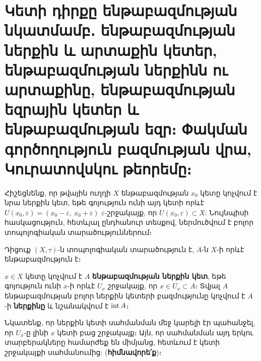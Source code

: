 \documentclass[./main.tex]{subfiles}
\begin{document}
\onehalfspacing




\section{Կետի դիրքը ենթաբազմության նկատմամբ․ ենթաբազմության ներքին և արտաքին կետեր, ենթաբազմության ներքինն ու արտաքինը, ենթաբազմության եզրային կետեր և ենթաբազմության եզր։ Փակման գործողություն բազմության վրա, Կուրատովսկու թեորեմը։}\label{sec:6}

Հիշեցնենք, որ թվային ուղղի $X$ ենթաբազմության $x_0$ կետը կոչվում է նրա ներքին կետ, եթե գոյություն ունի այդ կետի որևէ $U(x_0, \varepsilon) = (x_0 - \varepsilon,\ x_0 + \varepsilon)$ $\varepsilon$-շրջակայք, որ $U(x_0, \varepsilon) \subset X$: Նույնպիսի հասկացություն, հետևյալ ընդհանուր տեսքով, ներմուծվում է բոլոր տոպոլոգիական տարածություններում։

Դիցուք $(X, \tau)$-ն տոպոլոգիական տարածություն է, $A$-ն $X$-ի որևէ ենթաբազմու\-թյուն է։

\begin{definition}
$x \in X$ կետը կոչվում է $A$ \textbf{ենթաբազմության ներքին կետ}, եթե գոյություն ունի $x$-ի որևէ $U_x$ շրջակայք, որ $x\in U_x \subset A$։ Տվյալ $A$ ենթաբազմության բոլոր ներքին կետերի բազմությունը կոչվում է $A$-ի \textbf{ներքինը} և նշանակվում է $\operatorname{int} A$։
\end{definition}

Նկատենք, որ ներքին կետի սահմանման մեջ կարելի էր պահանջել, որ $U_x$-ը լինի $x$ կետի բաց շրջակայք։ Այն, որ սահմանման այդ երկու տարբերակները համարժեք են միմյանց, հետևում է կետի շրջակայքի սահմանումից: (\textbf{հիմնավորե՛ք})։
\end{document}
